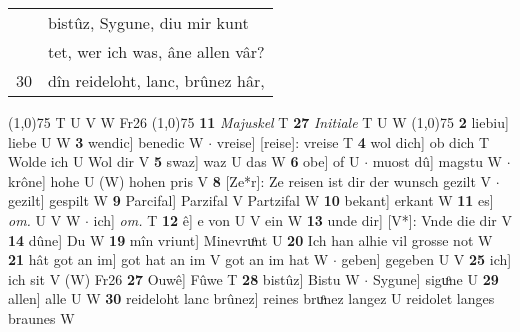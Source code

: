 \documentclass[8pt,a4paper,notitlepage]{article}
\begin{document}
\begin{table}[ht]
\begin{minipage}[t]{0.5\linewidth}
\begin{tabular}{rl}
 & bistûz, Sygune, diu mir kunt\\ 
 & tet, wer ich was, âne allen vâr?\\ 
30 & dîn reideloht, lanc, brûnez hâr,\\ 
\end{tabular}
\scriptsize
\line(1,0){75} \newline
T U V W Fr26 \newline
\line(1,0){75} \newline
\textbf{11} \textit{Majuskel} T  \textbf{27} \textit{Initiale} T U W  \newline
\line(1,0){75} \newline
\textbf{2} liebiu] liebe U W \textbf{3} wendic] benedic W  $\cdot$ vreise] [reise]: vreise T \textbf{4} wol dich] ob dich T Wolde ich U Wol dir V \textbf{5} swaz] waz U das W \textbf{6} obe] of U  $\cdot$ muost dû] magstu W  $\cdot$ krône] hohe U (W) hohen pris V \textbf{8} [Ze*r]: Ze reisen ist dir der wunsch gezilt V  $\cdot$ gezilt] gespilt W \textbf{9} Parcifal] Parzifal V Partzifal W \textbf{10} bekant] erkant W \textbf{11} es] \textit{om.} U V W  $\cdot$ ich] \textit{om.} T \textbf{12} ê] e von U V ein W \textbf{13} unde dir] [V*]: Vnde die dir V \textbf{14} dûne] Du W \textbf{19} mîn vriunt] Minevruͦnt U \textbf{20} Ich han alhie vil grosse not W \textbf{21} hât got an im] got hat an im V got an im hat W  $\cdot$ geben] gegeben U V \textbf{25} ich] ich sit V (W) Fr26 \textbf{27} Ouwê] Fûwe T \textbf{28} bistûz] Bistu W  $\cdot$ Sygune] siguͦne U \textbf{29} allen] alle U W \textbf{30} reideloht lanc brûnez] reines bruͦnez langez U reidolet langes braunes W \newline
\end{minipage}
\end{table}
\end{document}
